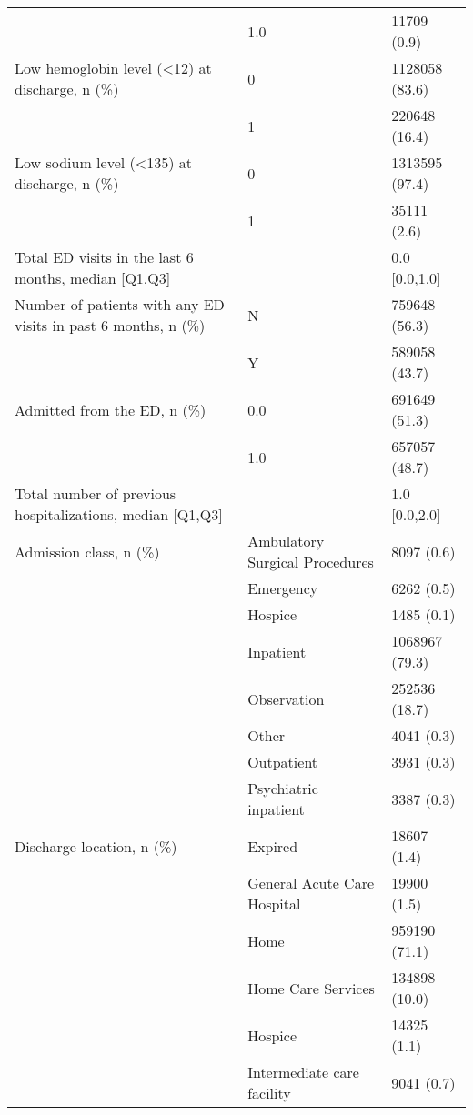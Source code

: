 \begin{tabular}{lll}
                           & 1.0 &        11709 (0.9) \\
Low hemoglobin level (<12) at discharge, n (\%) & 0 &     1128058 (83.6) \\
                           & 1 &      220648 (16.4) \\
Low sodium level (<135) at discharge, n (\%) & 0 &     1313595 (97.4) \\
                           & 1 &        35111 (2.6) \\
Total ED visits in the last 6 months, median [Q1,Q3] &   &      0.0 [0.0,1.0] \\
Number of patients with any ED visits in past 6 months, n (\%) & N &      759648 (56.3) \\
                           & Y &      589058 (43.7) \\
Admitted from the ED, n (\%) & 0.0 &      691649 (51.3) \\
                           & 1.0 &      657057 (48.7) \\
Total number of previous hospitalizations, median [Q1,Q3] &   &      1.0 [0.0,2.0] \\
Admission class, n (\%) & Ambulatory Surgical Procedures &         8097 (0.6) \\
                           & Emergency &         6262 (0.5) \\
                           & Hospice &         1485 (0.1) \\
                           & Inpatient &     1068967 (79.3) \\
                           & Observation &      252536 (18.7) \\
                           & Other &         4041 (0.3) \\
                           & Outpatient &         3931 (0.3) \\
                           & Psychiatric inpatient &         3387 (0.3) \\
Discharge location, n (\%) & Expired &        18607 (1.4) \\
                           & General Acute Care Hospital &        19900 (1.5) \\
                           & Home &      959190 (71.1) \\
                           & Home Care Services &      134898 (10.0) \\
                           & Hospice &        14325 (1.1) \\
                           & Intermediate care facility &         9041 (0.7) \\

\end{tabular}
